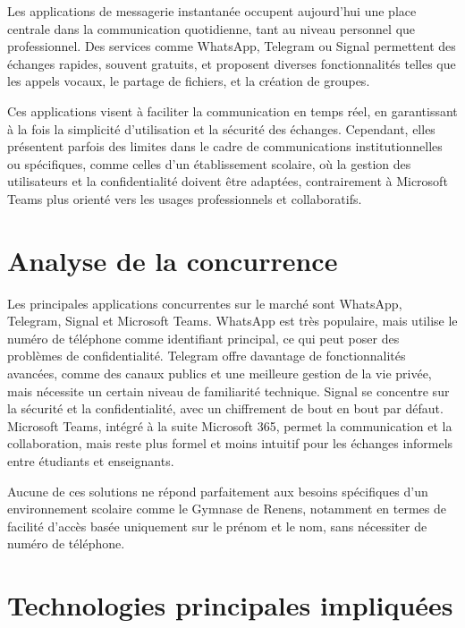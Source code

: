 \documentclass[12pt]{report}
\begin{document}
Les applications de messagerie instantanée occupent aujourd’hui une place centrale dans la communication quotidienne, tant au niveau personnel que professionnel. Des services comme WhatsApp\supercite{whatsapp}, Telegram\supercite{telegram} ou Signal\supercite{signal} permettent des échanges rapides, souvent gratuits, et proposent diverses fonctionnalités telles que les appels vocaux, le partage de fichiers, et la création de groupes.

Ces applications visent à faciliter la communication en temps réel, en garantissant à la fois la simplicité d’utilisation et la sécurité des échanges. Cependant, elles présentent parfois des limites dans le cadre de communications institutionnelles ou spécifiques, comme celles d’un établissement scolaire, où la gestion des utilisateurs et la confidentialité doivent être adaptées, contrairement à Microsoft Teams\supercite{teams} plus orienté vers les usages professionnels et collaboratifs.

\section{Analyse de la concurrence}

Les principales applications concurrentes sur le marché sont WhatsApp\supercite{whatsapp}, Telegram\supercite{telegram}, Signal\supercite{signal} et Microsoft Teams\supercite{teams}. WhatsApp\supercite{whatsapp} est très populaire, mais utilise le numéro de téléphone comme identifiant principal, ce qui peut poser des problèmes de confidentialité. Telegram\supercite{telegram} offre davantage de fonctionnalités avancées, comme des canaux publics et une meilleure gestion de la vie privée, mais nécessite un certain niveau de familiarité technique. Signal\supercite{signal} se concentre sur la sécurité et la confidentialité, avec un chiffrement de bout en bout par défaut. Microsoft Teams\supercite{teams}, intégré à la suite Microsoft 365, permet la communication et la collaboration, mais reste plus formel et moins intuitif pour les échanges informels entre étudiants et enseignants.  

Aucune de ces solutions ne répond parfaitement aux besoins spécifiques d’un environnement scolaire comme le Gymnase de Renens, notamment en termes de facilité d’accès basée uniquement sur le prénom et le nom, sans nécessiter de numéro de téléphone.

\section{Technologies principales impliquées}
\end{document}
